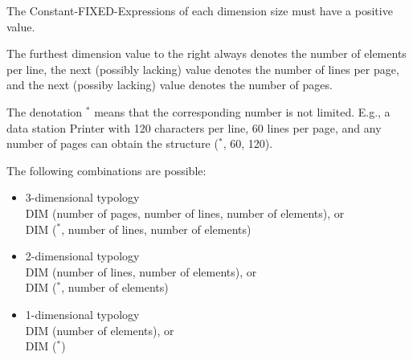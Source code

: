 


The Constant-FIXED-Expressions of each dimension size
 must have a positive value.

The furthest dimension value to the right always denotes the number of
elements per line,
 the next (possibly lacking) value denotes
the number of lines per page, and the next (possiby lacking)
value denotes the number of pages.

The denotation $^*$ means that
the corresponding number is not limited. E.g., a data station Printer
with 120 characters per line, 60 lines per page, and any number of pages
can obtain the structure ($^*$, 60, 120).

The following combinations are possible:
\begin{itemize}
\item 3-dimensional typology\\
DIM (number of pages, number of lines, number of elements), or\\
DIM ($^*$, number of lines, number of elements)
\item 2-dimensional typology\\
DIM (number of lines, number of elements), or\\
DIM ($^*$, number of elements)
\item 1-dimensional typology\\
DIM (number of elements), or\\
DIM ($^*$)
\end{itemize}

